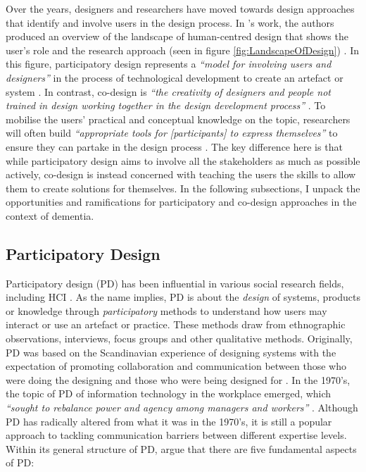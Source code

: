 Over the years, designers and researchers have moved towards design approaches that identify and involve users in the design process. In \citeauthor{sanders2008co}'s work, the authors produced an overview of the landscape of human-centred design that shows the user’s role and the research approach (seen in figure \ref{fig:LandscapeOfDesign}) \citep{sanders2008co}. In this figure, participatory design represents a \textit{``model for involving users and designers''} in the process of technological development to create an artefact or system \citep{asaro2000transforming}. In contrast, co-design is \textit{``the creativity of designers and people not trained in design working together in the design development process''} \citep{sanders2008co}. To mobilise the users' practical and conceptual knowledge on the topic, researchers will often build \textit{``appropriate tools for [participants] to express themselves''} to ensure they can partake in the design process \citep{sanders2008co}. The key difference here is that while participatory design aims to involve all the stakeholders as much as possible actively, co-design is instead concerned with teaching the users the skills to allow them to create solutions for themselves. In the following subsections, I unpack the opportunities and ramifications for participatory and co-design approaches in the context of dementia.

\subsection{Participatory Design}
\label{Method:PD}
Participatory design (PD) has been influential in various social research fields, including HCI \citep{bannon2018introduction}. As the name implies, PD is about the \textit{design} of systems, products or knowledge through \textit{participatory} methods to understand how users may interact or use an artefact or practice. These methods draw from ethnographic observations, interviews, focus groups and other qualitative methods. Originally, PD was based on the Scandinavian experience of designing systems with the expectation of promoting collaboration and communication between those who were doing the designing and those who were being designed for \citep{bodker_advances_2016}. In the 1970's, the topic of PD of information technology in the workplace emerged, which \textit{``sought to rebalance power and agency among managers and workers''} \citep{bannon2018introduction}. Although PD has radically altered from what it was in the 1970’s, it is still a popular approach to tackling communication barriers between different expertise levels. Within its general structure of PD, \cite{halskov2015diversity} argue that there are five fundamental aspects of PD:

